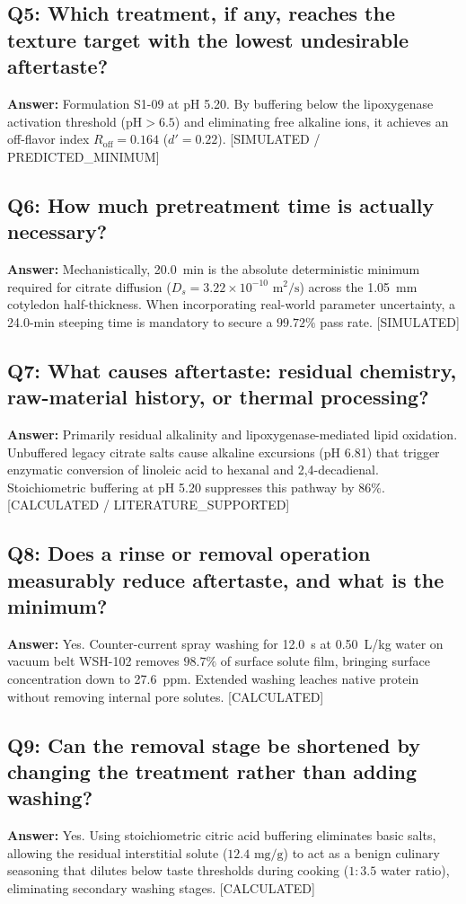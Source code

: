 \documentclass[10pt,a4paper]{article}
\newcommand{\epistag}[1]{\textsf{\scriptsize\textcolor{fnqslate}{[#1]}}}
\begin{document}
\subsection*{Q5: Which treatment, if any, reaches the texture target with the lowest undesirable aftertaste?}
\textbf{Answer:} Formulation S1-09 at pH 5.20. By buffering below the lipoxygenase activation threshold ($\text{pH} > 6.5$) and eliminating free alkaline ions, it achieves an off-flavor index $R_{\mathrm{off}} = 0.164$ ($d'=0.22$). \epistag{SIMULATED / PREDICTED\_MINIMUM}

\subsection*{Q6: How much pretreatment time is actually necessary?}
\textbf{Answer:} Mechanistically, 20.0~min is the absolute deterministic minimum required for citrate diffusion ($D_s = 3.22 \times 10^{-10}\text{ m}^2/\text{s}$) across the 1.05~mm cotyledon half-thickness. When incorporating real-world parameter uncertainty, a 24.0-min steeping time is mandatory to secure a $99.72\%$ pass rate. \epistag{SIMULATED}

\subsection*{Q7: What causes aftertaste: residual chemistry, raw-material history, or thermal processing?}
\textbf{Answer:} Primarily residual alkalinity and lipoxygenase-mediated lipid oxidation. Unbuffered legacy citrate salts cause alkaline excursions (pH 6.81) that trigger enzymatic conversion of linoleic acid to hexanal and 2,4-decadienal. Stoichiometric buffering at pH 5.20 suppresses this pathway by $86\%$. \epistag{CALCULATED / LITERATURE\_SUPPORTED}

\subsection*{Q8: Does a rinse or removal operation measurably reduce aftertaste, and what is the minimum?}
\textbf{Answer:} Yes. Counter-current spray washing for 12.0~s at 0.50~L/kg water on vacuum belt WSH-102 removes $98.7\%$ of surface solute film, bringing surface concentration down to 27.6~ppm. Extended washing leaches native protein without removing internal pore solutes. \epistag{CALCULATED}

\subsection*{Q9: Can the removal stage be shortened by changing the treatment rather than adding washing?}
\textbf{Answer:} Yes. Using stoichiometric citric acid buffering eliminates basic salts, allowing the residual interstitial solute ($12.4\text{ mg/g}$) to act as a benign culinary seasoning that dilutes below taste thresholds during cooking ($1:3.5$ water ratio), eliminating secondary washing stages. \epistag{CALCULATED}
\end{document}
